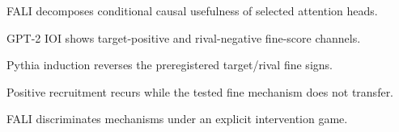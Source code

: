 \item FALI decomposes conditional causal usefulness of selected attention heads.
\item GPT-2 IOI shows target-positive and rival-negative fine-score channels.
\item Pythia induction reverses the preregistered target/rival fine signs.
\item Positive recruitment recurs while the tested fine mechanism does not transfer.
\item FALI discriminates mechanisms under an explicit intervention game.
